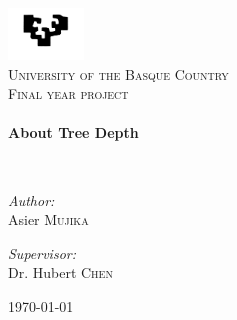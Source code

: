 \begin{titlepage}
\begin{center}

\includegraphics[width=0.15\textwidth]{logo}~\\[1cm]

\textsc{\LARGE University of the Basque Country}\\[1.5cm]

\textsc{\Large Final year project}\\[0.5cm]

\HRule \\[0.4cm]
{ \huge \bfseries About Tree Depth \\[0.4cm] }

\HRule \\[1.5cm]

\noindent
\begin{minipage}{0.4\textwidth}
\begin{flushleft} \large
\emph{Author:}\\
Asier \textsc{Mujika}
\end{flushleft}
\end{minipage}
\begin{minipage}{0.4\textwidth}
\begin{flushright} \large
\emph{Supervisor:} \\
Dr. Hubert \textsc{Chen}
\end{flushright}
\end{minipage}

\vfill

{\large \today}

\end{center}
\end{titlepage}
